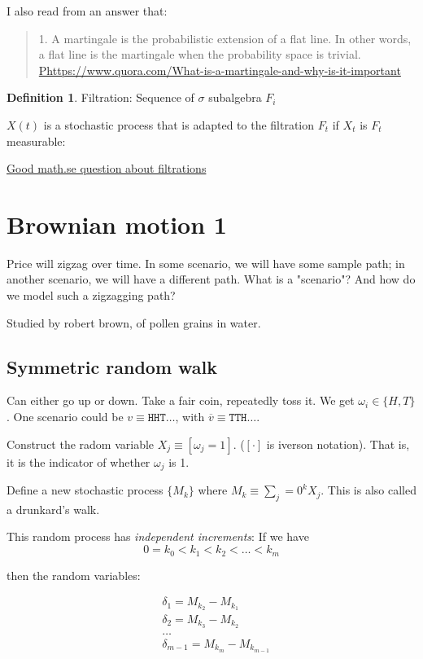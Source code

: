 \documentclass{book}
\theoremstyle{definition}
\newtheorem{definition}[theorem]{Definition}
\begin{document}
I also read from an answer that:

\begin{quote}
1. A martingale is the probabilistic extension of a flat line. In other words, a flat line is the martingale when the probability space is trivial. ~ 
\url{Phttps://www.quora.com/What-is-a-martingale-and-why-is-it-important}
\end{quote}


\begin{definition}
Filtration: Sequence of $\sigma$ subalgebra $F_i$
\end{definition}



$X(t)$ is a stochastic process that is adapted to the filtration $F_t$ if
$X_t$ is $F_t$ measurable:

\href{https://math.stackexchange.com/questions/2279205/example-of-filtration-in-probability-theory}{Good math.se question about filtrations}

\chapter{Brownian motion 1}
Price will zigzag over time. In some scenario, we will have some sample path;
in another scenario, we will have a different path. What is a "scenario"? And
how do we model such a zigzagging path?


Studied by robert brown, of pollen grains in water.

\section{Symmetric random walk}
Can either go up or down. Take a fair coin, repeatedly toss it. We get $\omega_i \in \{H, T\}$.
One scenario could be $v \equiv \texttt{HHT}\dots$, with $\overline v \equiv \texttt{TTH}\dots$.

Construct the radom variable $X_j \equiv [\omega_j = 1]$. ($[\cdot]$ is iverson notation). 
That is, it is the indicator of whether $\omega_j$ is 1.

Define a new stochastic process $\{ M_k \}$ where $M_k \equiv \sum_j=0^k X_j$.
This is also called a drunkard's walk.

This random process has \emph{independent increments}: If we have 
$$
0 = k_0 < k_1  < k_2 < \dots < k_m
$$

then the random variables:


\begin{align*}
& \delta_1 = M_{k_2} - M_{k_1} \\
& \delta_2 = M_{k_3} - M_{k_2} \\
& \dots \\
& \delta_{m-1} = M_{k_m} - M_{k_{m-1}} \\
\end{align*}
\end{document}
